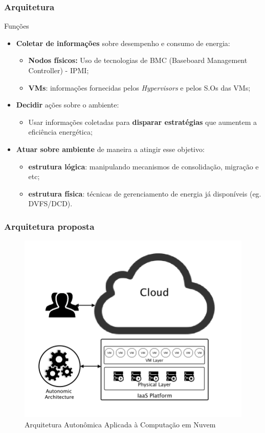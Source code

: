 \frame
{
\frametitle{Arquitetura}
\begin{block}{Funções}
	\begin{itemize}
		\item \textbf{Coletar de informações} sobre desempenho e consumo de energia:
		\begin{itemize}
			\item \textbf{Nodos físicos:} Uso de tecnologias de BMC (Baseboard Management Controller) - IPMI;
			\item \textbf{VMs}: informações fornecidas pelos \textit{Hypervisors} e pelos S.Os das VMs;
		\end{itemize}
		\item \textbf{Decidir} ações sobre o ambiente:
		\begin{itemize}
			\item Usar informações coletadas para \textbf{disparar estratégias} que aumentem a eficiência energética; 
		\end{itemize}
		\item \textbf{Atuar sobre ambiente} de maneira a atingir esse objetivo:
		\begin{itemize}
			\item \textbf{estrutura lógica}: manipulando mecanismos de consolidação, migração e etc;
			\item \textbf{estrutura física}: técnicas de gerenciamento de energia já disponíveis (eg. DVFS/DCD).
		\end{itemize}
	\end{itemize}
\end{block}
}

\frame
{
\frametitle{Arquitetura proposta}
	\vspace{-8mm}
   \begin{figure}[bhtp]
     \centering \includegraphics[scale=.32]{images/proposta.png}
	 \vspace{-8mm}
     \caption{Arquitetura Autonômica Aplicada à Computação em Nuvem}
   \end{figure}
}


